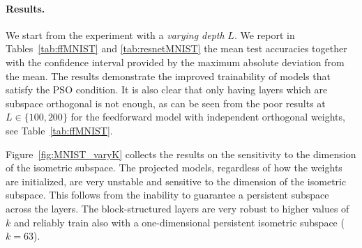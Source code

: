 \documentclass{article}
\theoremstyle{plain}
\theoremstyle{definition}
\theoremstyle{definition}
\theoremstyle{remark}
\theoremstyle{definition}
\theoremstyle{definition}
\theoremstyle{remark}
\numberwithin{equation}{section}
\begin{document}
\paragraph{Results.} We start from the experiment with a \textit{varying depth} $L$. We report in Tables~\ref{tab:ffMNIST} and \ref{tab:resnetMNIST} the mean test accuracies together with the confidence interval provided by the maximum absolute deviation from the mean. The results demonstrate the improved trainability of models that satisfy the PSO condition. It is also clear that only having layers which are subspace orthogonal is not enough, as can be seen from the poor results at $L\in\{100,200\}$ for the feedforward model with independent orthogonal weights, see Table~\ref{tab:ffMNIST}.

Figure~\ref{fig:MNIST_varyK} collects the results on the sensitivity to the dimension of the isometric subspace. The projected models, regardless of how the weights are initialized, are very unstable and sensitive to the dimension of the isometric subspace. This follows from the inability to guarantee a persistent subspace across the layers. The block-structured layers are very robust to higher values of $k$ and reliably train also with a one-dimensional persistent isometric subspace ($k=63$).
\end{document}
